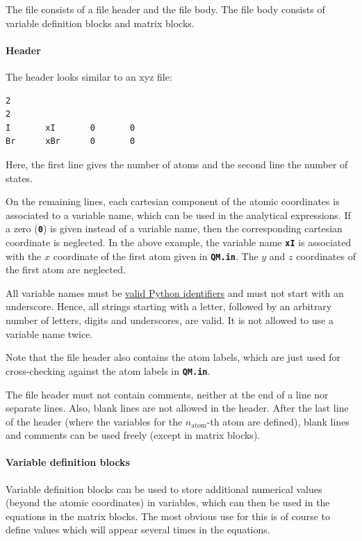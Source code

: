 \documentclass[a4paper,11pt,DIV=15,openany,twoside=false]{scrbook}
\newcommand{\ttt}[1]{\textbf{\texttt{#1}}}
\newenvironment{example}{
  \vspace{0mm}
  \definecolor{shadecolor}{HTML}{BBDDFF}
  \begin{shaded}
  \begin{minipage}{0.9\textwidth}
}{
  \end{minipage}
  \end{shaded}
}
\begin{document}
The file consists of a file header and the file body. The file body consists of variable definition blocks and matrix blocks.

\paragraph{Header} 

The header looks similar to an xyz file:
\begin{example}
  \begin{verbatim}
2
2
I       xI       0       0
Br      xBr      0       0
  \end{verbatim}
\end{example}
Here, the first line gives the number of atoms and the second line the number of states. 

On the remaining lines, each cartesian component of the atomic coordinates is associated to a variable name, which can be used in the analytical expressions. If a zero (\ttt{0}) is given instead of a variable name, then the corresponding cartesian coordinate is neglected. In the above example, the variable name \ttt{xI} is associated with the $x$ coordinate of the first atom given in \ttt{QM.in}. The $y$ and $z$ coordinates of the first atom are neglected.

All variable names must be \href{https://docs.python.org/2/reference/lexical_analysis.html#identifiers}{valid Python identifiers} and must not start with an underscore. Hence, all strings starting with a letter, followed by an arbitrary number of letters, digits and underscores, are valid. It is not allowed to use a variable name twice.

Note that the file header also contains the atom labels, which are just used for cross-checking against the atom labels in \ttt{QM.in}.

The file header must not contain comments, neither at the end of a line nor separate lines. Also, blank lines are not allowed in the header. After the last line of the header (where the variables for the $n_{\text{atom}}$-th atom are defined), blank lines and comments can be used freely (except in matrix blocks).

\paragraph{Variable definition blocks}

Variable definition blocks can be used to store additional numerical values (beyond the atomic coordinates) in variables, which can then be used in the equations in the matrix blocks. The most obvious use for this is of course to define values which will appear several times in the equations.
\end{document}
